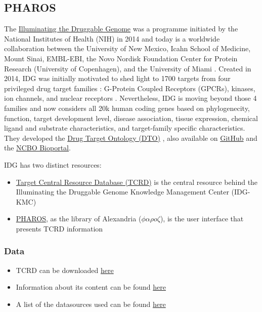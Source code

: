 \subsection{PHAROS}
\label{subsec:pharos}



 
The \href{https://druggablegenome.net/}{Illuminating the Druggable Genome} was a programme initiated by the National Institutes of Health (NIH) in 2014 and today is a worldwide collaboration between the University of New Mexico, Icahn School of Medicine, Mount Sinai, EMBL-EBI, the Novo Nordisk Foundation Center for Protein Research (University of Copenhagen), and the University of Miami \cite{pharos2016}.  Created in 2014, IDG was initially motivated to shed light to 1700 targets from four privileged drug target families \cite{santos2016}: G-Protein Coupled Receptors (GPCRs), kinases, ion channels, and nuclear receptors \cite{pharos2016}. Nevertheless, IDG is moving beyond those 4 families and now considers all 20k human coding genes \cite{pharos2016} based on phylogenecity, function, target development level, disease association, tissue expression, chemical ligand and substrate characteristics, and target-family specific characteristics. They developed the \href{http://drugtargetontology.org}{Drug Target Ontology (DTO)} \cite{lin2017}, also available on \href{http://github.com/DrugTargetOntology/DTO}{GitHub} and the \href{http://bioportal.bioontology.org/ontologies/DTO}{NCBO Bioportal}.

\noindent IDG has two distinct resources:

\begin{itemize}
    \item \href{http://juniper.health.unm.edu/tcrd/}{Target Central Resource Database (TCRD)} is the central resource behind the Illuminating the Druggable Genome Knowledge Management Center (IDG-KMC)
    
    \item \href{https://pharos.nih.gov/idg/index}{PHAROS}, as the library of Alexandria ($\phi \alpha \rho o \zeta$), is the user interface that presents TCRD information
    
\end{itemize}

\subsubsection{Data}
\begin{itemize}

    \item TCRD can be downloaded \href{http://juniper.health.unm.edu/tcrd/download/}{here}
    
    \item Information about its content can be found \href{http://habanero.health.unm.edu/tcrd/old/content.html}{here}
    
    \item A list of the datasources used can be found \href{http://targetcentral.ws/Pharos}{here}
    
\end{itemize}

